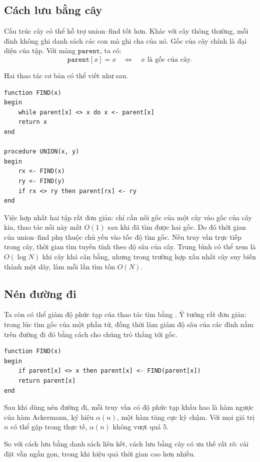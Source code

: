 \documentclass[11pt]{article}
\begin{document}
\subsection{Cách lưu bằng cây}

Cấu trúc cây có thể hỗ trợ union--find tốt hơn. Khác với cây thông thường,
mỗi đỉnh không ghi danh sách các con mà ghi cha của nó. Gốc của cây chính là
đại diện của tập. Với mảng \(\texttt{parent}\), ta có:
\[
  \texttt{parent}[x]=x \quad\Longleftrightarrow\quad x
  \text{ là gốc của cây.}
\]

Hai thao tác cơ bản có thể viết như sau.

\begin{verbatim}
function FIND(x)
begin
    while parent[x] <> x do x <- parent[x]
    return x
end

procedure UNION(x, y)
begin
    rx <- FIND(x)
    ry <- FIND(y)
    if rx <> ry then parent[rx] <- ry
end
\end{verbatim}

Việc hợp nhất hai tập rất đơn giản: chỉ cần nối gốc của một cây vào gốc của
cây kia, thao tác nối này mất \(O(1)\) sau khi đã tìm được hai gốc. Do đó
thời gian của union--find phụ thuộc chủ yếu vào tốc độ tìm gốc. Nếu truy vấn
trực tiếp trong cây, thời gian tìm tuyến tính theo độ sâu của cây. Trung bình
có thể xem là \(O(\log N)\) khi cây khá cân bằng, nhưng trong trường hợp xấu
nhất cây suy biến thành một dây, làm mỗi lần tìm tốn \(O(N)\).

\subsection{Nén đường đi}

Ta còn có thể giảm độ phức tạp của thao tác tìm bằng . Ý
tưởng rất đơn giản: trong lúc tìm gốc của một phần tử, đồng thời làm giảm độ
sâu của các đỉnh nằm trên đường đi đó bằng cách cho chúng trỏ thẳng tới gốc.

\begin{verbatim}
function FIND(x)
begin
    if parent[x] <> x then parent[x] <- FIND(parent[x])
    return parent[x]
end
\end{verbatim}

Sau khi dùng nén đường đi, mỗi truy vấn có độ phức tạp khấu hao là hàm ngược
của hàm Ackermann, ký hiệu \(\alpha(n)\), một hàm tăng cực kỳ chậm. Với mọi
giá trị \(n\) có thể gặp trong thực tế, \(\alpha(n)\) không vượt quá \(5\).

So với cách lưu bằng danh sách liên kết, cách lưu bằng cây có ưu thế rất rõ:
cài đặt vẫn ngắn gọn, trong khi hiệu quả thời gian cao hơn nhiều.
\end{document}
